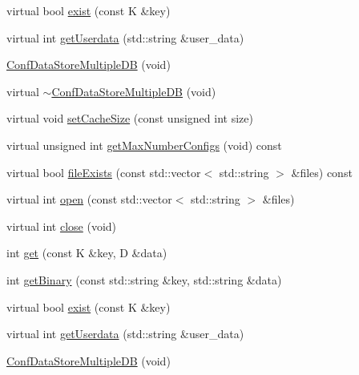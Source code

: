 \begin{DoxyCompactItemize}
\item 
virtual bool \mbox{\hyperlink{classFILEDB_1_1ConfDataStoreMultipleDB_ad80312a9a4767f3b0b567932542d3ee7}{exist}} (const K \&key)
\item 
virtual int \mbox{\hyperlink{classFILEDB_1_1ConfDataStoreMultipleDB_aa3f101137804c73d44e2d87538acc014}{get\+Userdata}} (std\+::string \&user\+\_\+data)
\item 
\mbox{\hyperlink{classFILEDB_1_1ConfDataStoreMultipleDB_a90ff1c27ea7415ba0d874df53fd0b955}{Conf\+Data\+Store\+Multiple\+DB}} (void)
\item 
virtual \mbox{\hyperlink{classFILEDB_1_1ConfDataStoreMultipleDB_a8025977163f25ad73764a794d0c89271}{$\sim$\+Conf\+Data\+Store\+Multiple\+DB}} (void)
\item 
virtual void \mbox{\hyperlink{classFILEDB_1_1ConfDataStoreMultipleDB_a37115269cf1f8f04c49ab888b040fa13}{set\+Cache\+Size}} (const unsigned int size)
\item 
virtual unsigned int \mbox{\hyperlink{classFILEDB_1_1ConfDataStoreMultipleDB_adb7a350dc85ad9c3830e98a0f03b68d7}{get\+Max\+Number\+Configs}} (void) const
\item 
virtual bool \mbox{\hyperlink{classFILEDB_1_1ConfDataStoreMultipleDB_a85c71818db3a3b0a5a67b4dabaed2ff7}{file\+Exists}} (const std\+::vector$<$ std\+::string $>$ \&files) const
\item 
virtual int \mbox{\hyperlink{classFILEDB_1_1ConfDataStoreMultipleDB_a3370c2f938d91e2352815aa45637b46d}{open}} (const std\+::vector$<$ std\+::string $>$ \&files)
\item 
virtual int \mbox{\hyperlink{classFILEDB_1_1ConfDataStoreMultipleDB_a6ab94d980290baa33292b7ec54bfe637}{close}} (void)
\item 
int \mbox{\hyperlink{classFILEDB_1_1ConfDataStoreMultipleDB_a15c985c05120d6076e890f0507ceade7}{get}} (const K \&key, D \&data)
\item 
int \mbox{\hyperlink{classFILEDB_1_1ConfDataStoreMultipleDB_a56fefab208c1b4abc3139afb38035a13}{get\+Binary}} (const std\+::string \&key, std\+::string \&data)
\item 
virtual bool \mbox{\hyperlink{classFILEDB_1_1ConfDataStoreMultipleDB_ad80312a9a4767f3b0b567932542d3ee7}{exist}} (const K \&key)
\item 
virtual int \mbox{\hyperlink{classFILEDB_1_1ConfDataStoreMultipleDB_aa3f101137804c73d44e2d87538acc014}{get\+Userdata}} (std\+::string \&user\+\_\+data)
\item 
\mbox{\hyperlink{classFILEDB_1_1ConfDataStoreMultipleDB_a90ff1c27ea7415ba0d874df53fd0b955}{Conf\+Data\+Store\+Multiple\+DB}} (void)

\end{DoxyCompactItemize}
